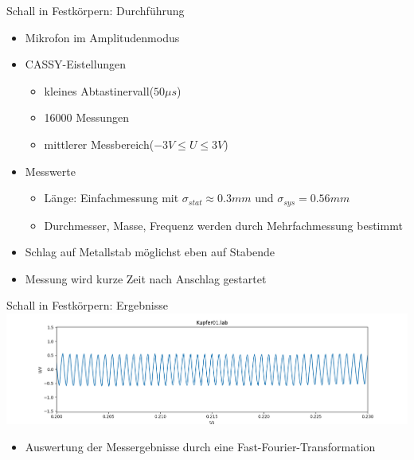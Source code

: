 \documentclass[12pt]{beamer}
\begin{document}
\begin{frame}{Schall in Festkörpern: Durchführung}
	\begin{itemize}
		\item Mikrofon im Amplitudenmodus
		\item CASSY-Eistellungen
		\begin{itemize}
			\item kleines Abtastinervall($50\mu s$)
			\item 16000 Messungen
			\item mittlerer Messbereich($-3V\leq U\leq 3V$)
		\end{itemize}
		\item Messwerte
		\begin{itemize}
			\item Länge: Einfachmessung mit $\sigma_{stat}\approx0.3mm$ und $\sigma_{sys}=0.56mm$
			\item Durchmesser, Masse, Frequenz werden durch Mehrfachmessung bestimmt
		\end{itemize}
		\item Schlag auf Metallstab möglichst eben auf Stabende
		\item Messung wird kurze Zeit nach Anschlag gestartet
	\end{itemize}
\end{frame}

\begin{frame}{Schall in Festkörpern: Ergebnisse}
	\includegraphics[width=\linewidth,height=\textheight,keepaspectratio]{Bilder/Kupfer01.PNG}
	\begin{itemize}
		\item Auswertung der Messergebnisse durch eine Fast-Fourier-Transformation
	\end{itemize}
\end{frame}
\end{document}
